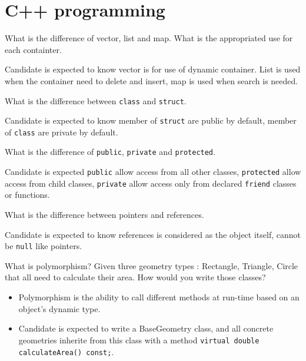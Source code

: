 \documentclass[answers]{exam}
\begin{document}
\section{C++ programming}
\begin{questions}
	
\question What is the difference of vector, list and map. What is the appropriated use for each containter.
\begin{solution}[.2in]
	Candidate is expected to know vector is for use of dynamic container. List is used when the container need to delete and insert, map is used when search is needed.
\end{solution}

\question What is the difference between \lstinline{class} and \lstinline{struct}.
\begin{solution}[.2in]
	Candidate is expected to know member of \lstinline{struct} are public by default, member of \lstinline{class} are private by default.
\end{solution}

\question What is the difference of \lstinline{public}, \lstinline{private} and \lstinline{protected}.
\begin{solution}[.2in]
	Candidate is expected \lstinline{public} allow access from all other classes, \lstinline{protected} allow access from child classes, \lstinline{private} allow access only from declared \lstinline{friend} classes or functions.
\end{solution}

\question What is the difference between pointers and references.
\begin{solution}[.2in]
    Candidate is expected to know references is considered as the object itself, cannot be \lstinline{null} like pointers.
\end{solution}

\question What is polymorphism? Given three geometry types : Rectangle, Triangle, Circle that all need to calculate their area. How would you write those classes?
\begin{solution}[.2in]
\begin{itemize}
	\item Polymorphism is the ability to call different methods at run-time based on an object’s dynamic type. 
	\item Candidate is expected to write a BaseGeometry class, and all concrete geometries inherite from this class with a method \lstinline{virtual double calculateArea() const;}.
\end{itemize}
\end{solution}


\end{questions}
\end{document}
